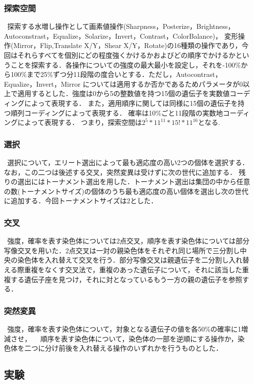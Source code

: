\documentclass[twocolumn]{jarticle}     %
\begin{document}
\subsubsection{探索空間}
\ 探索する水増し操作として画素値操作(Sharpness，Posterize，Brightness，Autoconstrast，Equalize，Solarize，Invert，Contrast，ColorBalance)，
変形操作(Mirror，Flip,Translate X/Y，Shear X/Y，Rotate)の16種類の操作であり，今回はそれらすべてを個別にどの程度強くかけるかおよびどの順序でかけるかということを探索する．各操作についての強度の最大最小を設定し，それを-100\%から100\%まで25\%ずつ分11段階の度合いとする．ただし，Autocontrast，Equalize，Invert，Mirror については適用するか否かであるためパラメータが0以上で適用するとした．強度は0から5の整数値を持つ15個の遺伝子を実数値コーディングによって表現する．
また，適用順序に関しては同様に15個の遺伝子を持つ順列コーディングによって表現する．
確率は10\%ごと11段階の実数地コーディングによって表現する．
つまり，探索空間は$2^5*11^{11}*15!*11^{16}$となる.

\subsubsection{選択}
\ 選択について，エリート選出によって最も適応度の高い2つの個体を選択する．なお，この二つは後述する交叉，突然変異は受けずに次の世代に追加する．
残りの選出にはトーナメント選出を用した．トーナメント選出は集団の中から任意の数(トーナメントサイズ)の個体のうち最も適応度の高い個体を選出し次の世代に追加する．今回トーナメントサイズは2とした．
　
\subsubsection{交叉}
\ 強度，確率を表す染色体については2点交叉，順序を表す染色体については部分写像交叉を用いた．2点交叉は一対の親染色体をそれぞれ同じ場所で三分割し中央の染色体を入れ替えて交叉を行う．部分写像交叉は親遺伝子を二分割し入れ替える際重複をなくす交叉法で，重複のあった遺伝子について，それに該当した重複する遺伝子座を見つけ，それに対となっているもう一方の親の遺伝子を参照する．
　
\subsubsection{突然変異}
\ 強度，確率を表す染色体について，対象となる遺伝子の値を各50\%の確率に1増減させ，
　順序を表す染色体について，染色体の一部を逆順にする操作か，染色体を二つに分け前後を入れ替える操作のいずれかを行うものとした．
　

\subsection{実験}　
\end{document}
